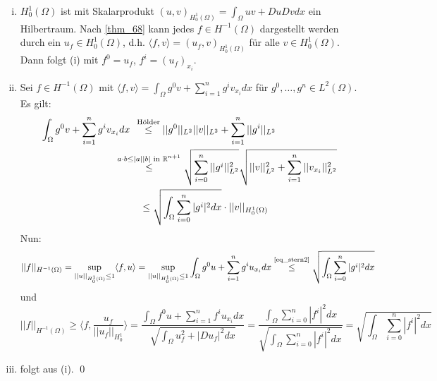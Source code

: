 	\begin{enumerate}[(i)]
	\item $H_0^1(\Omega)$ ist mit Skalarprodukt $(u,v)_{H_0^1(\Omega)} = \int_{\Omega} uv + Du Dv dx$ ein Hilbertraum. Nach \ref{thm_68} kann jedes $f \in H^{-1}(\Omega)$ dargestellt werden durch ein $u_f \in H_0^1(\Omega)$, d.h. $\langle f,v \rangle = (u_f,v)_{H_0^1(\Omega)}$ für alle $v \in H_0^1(\Omega)$. Dann folgt (i) mit $f^0 = u_f$, $f^i = (u_f) _{x_i}$.
	\item Sei $f \in H^{-1}(\Omega)$ mit $\langle f,v \rangle = \int_{\Omega} g^0 v + \sum_{i=1}^n g^i v_{x_i} dx$ für $g^0,\dots,g^n \in L^2(\Omega)$. Es gilt:
	\begin{equation}
	\begin{aligned}
		\int_{\Omega} g^0 v + \sum\limits_{i=1}^{n} g^i v_{x_i} dx \quad &\hspace{-2mm}\overset{\text{Hölder}}{\leq} ||g^0||_{L^2} ||v||_{L^2} + \sum\limits_{i=1}^{n} ||g^i||_{L^2} \\
		&\hspace{-9mm}\overset{a \cdot b \leq |a||b| \text{ in } \RR^{n+1}}{\leq} \sqrt{\sum\limits_{i=0}^{n} ||g^i||_{L^2}^2} \sqrt{||v||_{L^2}^2 + \sum\limits_{i=1}^n ||v_{x_i}||_{L^2}^2} \\
		&\leq \sqrt{\int_{\Omega} \sum\limits_{i=0}^n |g^i|^2 dx} \cdot ||v||_{H_0^1(\Omega)} \label{eq_stern2}
	\end{aligned}
	\end{equation}
	Nun:
	\[ ||f||_{H^{-1}(\Omega)} = \sup\limits_{||u||_{H_0^1(\Omega)} \leq 1} \langle f,u \rangle = \sup\limits_{||u||_{H_0^1(\Omega)} \leq 1} \int_{\Omega} g^0 u + \sum_{i=1}^n g^i u_{x_i} dx \overset{\text{\eqref{eq_stern2}}}{\leq} \sqrt{\int_{\Omega} \sum\limits_{i=0}^{n} |g^i|^2 dx} \]
	und
	\[ ||f||_{H^{-1}(\Omega)} \geq \langle f,\frac{u_f}{||u_f||_{H_0^1}} \rangle = \frac{\int_{\Omega} f^0 u + \sum\limits_{i=1}^{n} f^i u_{x_i} dx}{\sqrt{\int_\Omega u_f^2 + |Du_f|^2 dx}} = \frac{\int_{\Omega} \sum\limits_{i=0}^{n} |f^i|^2 dx}{\sqrt{\int_\Omega \sum\limits_{i=0}^{n} |f^i|^2 dx}} = \sqrt{\int_{\Omega} \sum\limits_{i=0}^{n} |f^i|^2 dx} \]
	\item folgt aus (i). \qed
	\end{enumerate}
	
